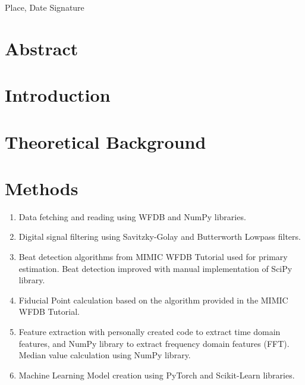 \documentclass[12pt, bibliography=totoc]{scrartcl}
\begin{document}
Place, Date \tab Signature

\newpage

\tableofcontents

\newpage
\onehalfspacing

\section{Abstract}\label{sec:abstract}


\section{Introduction}
\label{sec:introduction}


\section{Theoretical Background}
\label{sec:background}


\section{Methods}
\label{sec:methods}

\begin{enumerate}

\item Data fetching and reading using WFDB and NumPy libraries.

\item Digital signal filtering using Savitzky-Golay and Butterworth Lowpass filters.

\item Beat detection algorithms from MIMIC WFDB Tutorial used for primary estimation.
Beat detection improved with manual implementation of SciPy library.

\item Fiducial Point calculation based on the algorithm provided in the MIMIC WFDB Tutorial.

\item Feature extraction with personally created code to extract time domain features, and NumPy library to extract frequency domain features (FFT). Median value calculation using NumPy library.

\item Machine Learning Model creation using PyTorch and Scikit-Learn libraries.

\end{enumerate}
\end{document}
